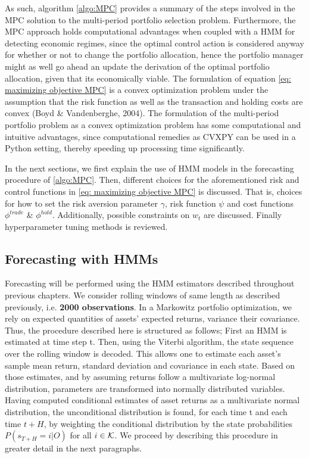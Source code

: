 As such, algorithm \ref{algo:MPC} provides a summary of the steps involved in the MPC solution to the multi-period portfolio selection problem. Furthermore, the MPC approach holds computational advantages when coupled with a HMM for detecting economic regimes, since the optimal control action is considered anyway for whether or not to change the portfolio allocation, hence the portfolio manager might as well go ahead an update the derivation of the optimal portfolio allocation, given that its economically viable. The formulation of equation \ref{eq: maximizing objective MPC} is a convex optimization problem under the assumption that the risk function as well as the transaction and holding costs are convex (Boyd \& Vandenberghe, 2004). The formulation of the multi-period portfolio problem as a convex optimization problem has some computational and intuitive advantages, since computational remedies as CVXPY can be used in a Python setting, thereby speeding up processing time significantly.

In the next sections, we first explain the use of HMM models in the forecasting procedure of \cref{algo:MPC}. Then, different choices for the aforementioned risk and control functions in \cref{eq: maximizing objective MPC} is discussed. That is, choices for how to set the risk aversion parameter $\gamma$, risk function $\psi$ and cost functions $\phi^{trade}$ \& $\phi^{hold}$. Additionally, possible constraints on $w_t$ are discussed. Finally hyperparameter tuning methods is reviewed.

\subsection{Forecasting with HMMs}
\label{section: forecasting MPC HMM}

Forecasting will be performed using the HMM estimators described throughout previous chapters. We consider rolling windows of same length as described previously, i.e. \textbf{2000 observations}. In a Markowitz portfolio optimization, we rely on expected quantities of assets' expected returns, variance their covariance. Thus, the procedure described here is structured as follows; First an HMM is estimated at time step t. Then, using the Viterbi algorithm, the state sequence over the rolling window is decoded. This allows one to estimate each asset's sample mean return, standard deviation and covariance in each state. Based on those estimates, and by assuming returns follow a multivariate log-normal distribution, parameters are transformed into normally distributed variables. Having computed conditional estimates of asset returns as a multivariate normal distribution, the unconditional distribution is found, for each time t and each time $t+H$, by weighting the conditional distribution by the state probabilities $P(s_{T+H}=i | O)$ for all $i\in\operatorname{\mathcal{K}}$. We proceed by describing this procedure in greater detail in the next paragraphs.

